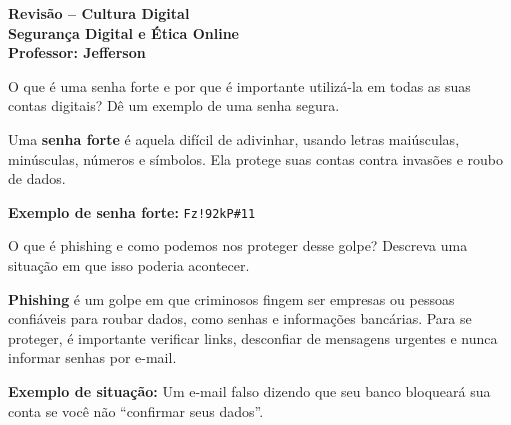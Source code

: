 \documentclass[11pt]{article}
\begin{document}
\begin{center}
\Large \textbf{Revisão – Cultura Digital} \\
\large \textbf{Segurança Digital e Ética Online}
\\[0.5cm]

\textbf{Professor: Jefferson}
\end{center}


\begin{tcolorbox}[colback=blue!10,colframe=blue!60!black,
title=\textbf{Questão 1 – Senha Forte}]
O que é uma senha forte e por que é importante utilizá-la em todas as suas contas digitais?
Dê um exemplo de uma senha segura.
\end{tcolorbox}

\begin{tcolorbox}[colback=green!10,colframe=green!60!black,
title=\textbf{Solução 1 — Explicação }]
Uma \textbf{senha forte} é aquela difícil de adivinhar, usando letras maiúsculas, minúsculas,
números e símbolos. Ela protege suas contas contra invasões e roubo de dados.

\textbf{Exemplo de senha forte:} \texttt{Fz!92kP\#11}
\end{tcolorbox}


\begin{tcolorbox}[colback=blue!10,colframe=blue!60!black,
title=\textbf{Questão 2 – Phishing}]
O que é phishing e como podemos nos proteger desse golpe?  
Descreva uma situação em que isso poderia acontecer.
\end{tcolorbox}

\begin{tcolorbox}[colback=green!10,colframe=green!60!black,
title=\textbf{Solução 2 — Explicação }]
\textbf{Phishing} é um golpe em que criminosos fingem ser empresas ou pessoas confiáveis
para roubar dados, como senhas e informações bancárias.  
Para se proteger, é importante verificar links, desconfiar de mensagens urgentes
e nunca informar senhas por e-mail.

\textbf{Exemplo de situação:}  
Um e-mail falso dizendo que seu banco bloqueará sua conta se você não “confirmar seus dados”.
\end{tcolorbox}
\end{document}
